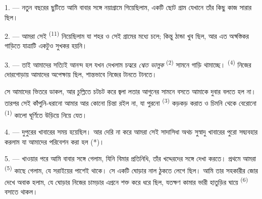%


\VUsaut{4.0mm}
\VUsaut{3.0mm}
\VUfilet{16mm}
\VUsaut{5.6mm}
\VUsaut{3.0mm}

\VUsaut{3.0mm}

\VUsaut{4.0mm}

1. --- নতুন বছরের ছুটিতে আমি বাবার সঙ্গে নয়াগ্রামে গিয়েছিলাম, একটি ছোট গ্রাম
যেখানে তাঁর কিছু কাজ সারার ছিল।

2. --- আমরা সেই  \textsuperscript{(11)} নিয়েছিলাম যা শহর ও
সেই গ্রামের মধ্যে চলে; কিন্তু ঠান্ডা খুব ছিল, আর এত অস্বস্তিকর গাড়িতে
যাত্রাটি একটুও সুখকর হয়নি।

3. --- তাই আমাদের সত্যিই আনন্দ হল যখন দেখলাম  চত্বরে
\textit{শ্বেত ভালুক}  \textsuperscript{(2)} সামনে গাড়ি
থামাচ্ছে।  \textsuperscript{(4)} নিজের দোরগোড়ায় আমাদের
অপেক্ষায় ছিল, শান্তভাবে নিজের  টানতে টানতে।

সে আমাদের ভিতরে ডাকল, আর চুল্লিতে চটচট করে জ্বলা লতার আগুনের সামনে বসতে আমাকে
দুবার বলতে হল না। তারপর সেই কাঁপুনি-ধরানো  আমার আর কোনো
চিন্তা রইল না, যা পুরনো  \textsuperscript{(3)} কড়কড় করাত ও
চিমনি থেকে বেরোনো  \textsuperscript{(1)} কালো ঘূর্ণিতে উড়িয়ে
নিয়ে যেত।

4. --- দুপুরের খাবারের সময় হয়েছিল। আর দেরি না করে আমরা সেই সাদাসিধা অথচ
সুস্বাদু খাবারের পুরো সদ্ব্যবহার করলাম যা আমাদের পরিবেশন করা হল (*)।

\VUsaut{3.0mm}

5. --- খাওয়ার পরে আমি বাবার সঙ্গে গেলাম, যিনি বিমার প্রতিনিধি, তাঁর
খদ্দেরদের সঙ্গে দেখা করতে। প্রথমে আমরা  \textsuperscript{(5)}
কাছে গেলাম, যে সরাইয়ের পাশেই থাকে। সে একটি ঘোড়ার নাল ঠুকতে লেগে ছিল। আমি
তার সহকারীর জোর দেখে অবাক হলাম, যে ঘোড়ার  নিজের চামড়ার
এপ্রনে শক্ত করে ধরে ছিল, যতক্ষণ কামার ভারী হাতুড়ির ঘায়ে 
\textsuperscript{(6)} বসাতে থাকল।

